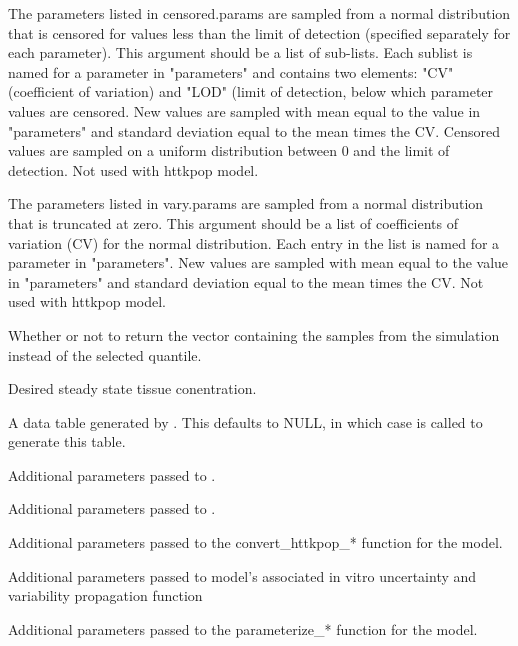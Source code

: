 \documentclass[a4paper]{book}
\begin{document}
\begin{Arguments}
\begin{ldescription}
\item[\code{censored.params}] The parameters listed in censored.params are sampled
from a normal distribution that is censored for values less than the limit
of detection (specified separately for each parameter). This argument should
be a list of sub-lists. Each sublist is named for a parameter in
"parameters" and contains two elements: "CV" (coefficient of variation) and
"LOD" (limit of detection, below which parameter values are censored. New
values are sampled with mean equal to the value in "parameters" and standard
deviation equal to the mean times the CV.  Censored values are sampled on a
uniform distribution between 0 and the limit of detection. Not used with
httkpop model.

\item[\code{vary.params}] The parameters listed in vary.params are sampled from a
normal distribution that is truncated at zero. This argument should be a
list of coefficients of variation (CV) for the normal distribution. Each
entry in the list is named for a parameter in "parameters". New values are
sampled with mean equal to the value in "parameters" and standard deviation
equal to the mean times the CV. Not used with httkpop model.

\item[\code{return.samples}] Whether or not to return the vector containing the
samples from the simulation instead of the selected quantile.

\item[\code{tissue}] Desired steady state tissue conentration.

\item[\code{httkpop.dt}] A data table generated by .
This defaults to NULL, in which case  is 
called to generate this table.

\item[\code{invitro.mc.arg.list}] Additional parameters passed to 
.

\item[\code{httkpop.generate.arg.list}] Additional parameters passed to 
.

\item[\code{convert.httkpop.arg.list}] Additional parameters passed to the 
convert\_httkpop\_* function for the model.

\item[\code{propagate.invitrouv.arg.list}] Additional parameters passed to model's
associated in vitro uncertainty and variability propagation function

\item[\code{parameterize.arg.list}] Additional parameters passed to the 
parameterize\_* function for the model.
\end{ldescription}
\end{Arguments}
\end{document}
